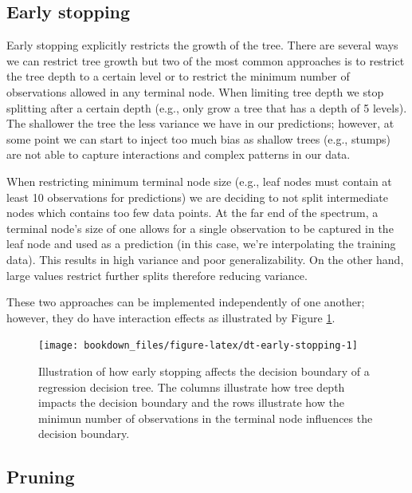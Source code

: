 \documentclass[]{krantz}
\begin{document}
\hypertarget{early-stopping}{%
\subsection{Early stopping}\label{early-stopping}}

Early stopping explicitly restricts the growth of the tree. There are several ways we can restrict tree growth but two of the most common approaches is to restrict the tree depth to a certain level or to restrict the minimum number of observations allowed in any terminal node. When limiting tree depth we stop splitting after a certain depth (e.g., only grow a tree that has a depth of 5 levels). The shallower the tree the less variance we have in our predictions; however, at some point we can start to inject too much bias as shallow trees (e.g., stumps) are not able to capture interactions and complex patterns in our data.

When restricting minimum terminal node size (e.g., leaf nodes must contain at least 10 observations for predictions) we are deciding to not split intermediate nodes which contains too few data points. At the far end of the spectrum, a terminal node's size of one allows for a single observation to be captured in the leaf node and used as a prediction (in this case, we're interpolating the training data). This results in high variance and poor generalizability. On the other hand, large values restrict further splits therefore reducing variance.

These two approaches can be implemented independently of one another; however, they do have interaction effects as illustrated by Figure \ref{fig:dt-early-stopping}.

\begin{figure}

{\centering \texttt{[image: bookdown\_files/figure-latex/dt-early-stopping-1]} 

}

\caption{Illustration of how early stopping affects the decision boundary of a regression decision tree. The columns illustrate how tree depth impacts the decision boundary and the rows illustrate how the minimun number of observations in the terminal node influences the decision boundary.}\label{fig:dt-early-stopping}
\end{figure}

\hypertarget{pruning}{%
\subsection{Pruning}\label{pruning}}
\end{document}
